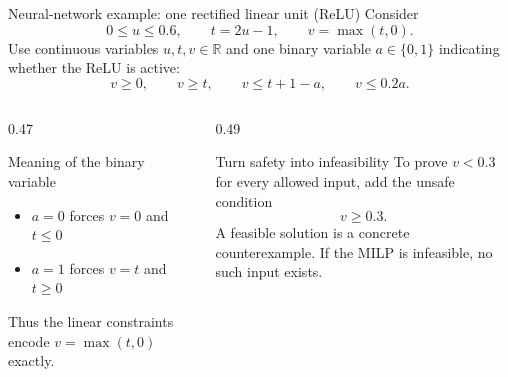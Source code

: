 \documentclass[aspectratio=169,11pt]{beamer}
\begin{document}
\begin{frame}{Neural-network example: one rectified linear unit (ReLU)}
  Consider
  \[
    0\leq u\leq0.6,\qquad t=2u-1,\qquad v=\max(t,0).
  \]
  Use continuous variables $u,t,v\in\mathbb{R}$ and one binary variable
  $a\in\{0,1\}$ indicating whether the ReLU is active:
  \[
    v\geq0,\qquad v\geq t,\qquad
    v\leq t+1-a,\qquad v\leq0.2a.
  \]

  \begin{columns}[T]
    \begin{column}{0.47\textwidth}
      \begin{block}{Meaning of the binary variable}
        \begin{itemize}
          \item $a=0$ forces $v=0$ and $t\leq0$
          \item $a=1$ forces $v=t$ and $t\geq0$
        \end{itemize}
        Thus the linear constraints encode $v=\max(t,0)$ exactly.
      \end{block}
    \end{column}
    \begin{column}{0.49\textwidth}
      \begin{block}{Turn safety into infeasibility}
        To prove $v<0.3$ for every allowed input, add the unsafe condition
        \[
          v\geq0.3.
        \]
        A feasible solution is a concrete counterexample. If the MILP is infeasible,
        no such input exists.
      \end{block}
    \end{column}
  \end{columns}
\end{frame}
\end{document}
